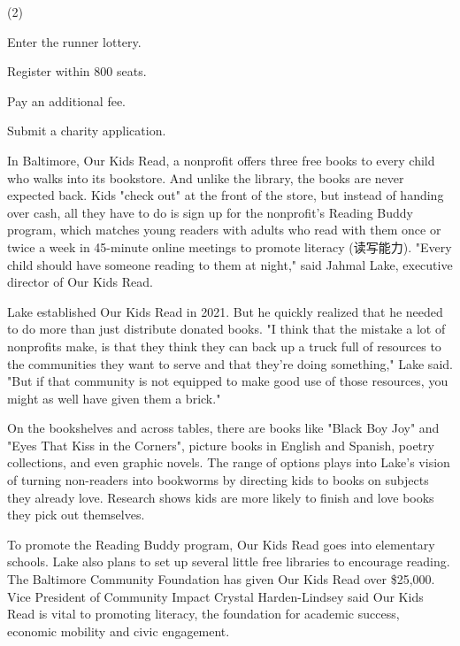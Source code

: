 \documentclass{英语试卷}
\begin{document}
\begin{choices}(2)
  \item Enter the runner lottery.
  \item Register within 800 seats.
  \item Pay an additional fee.
  \item Submit a charity application.
\end{choices}
\par In Baltimore, Our Kids Read, a nonprofit offers three free books to every child who walks into its bookstore. And unlike the library, the books are never expected back. Kids "check out" at the front of the store, but instead of handing over cash, all they have to do is sign up for the nonprofit’s Reading Buddy program, which matches young readers with adults who read with them once or twice a week in 45-minute online meetings to promote literacy (读写能力). "Every child should have someone reading to them at night," said Jahmal Lake, executive director of Our Kids Read.\par
\par Lake established Our Kids Read in 2021. But he quickly realized that he needed to do more than just distribute donated books. "I think that the mistake a lot of nonprofits make, is that they think they can back up a truck full of resources to the communities they want to serve and that they're doing something," Lake said. "But if that community is not equipped to make good use of those resources, you might as well have given them a brick."\par
\par On the bookshelves and across tables, there are books like "Black Boy Joy" and "Eyes That Kiss in the Corners", picture books in English and Spanish, poetry collections, and even graphic novels. The range of options plays into Lake's vision of turning non-readers into bookworms by directing kids to books on subjects they already love. Research shows kids are more likely to finish and love books they pick out themselves.\par
\par To promote the Reading Buddy program, Our Kids Read goes into elementary schools. Lake also plans to set up several little free libraries to encourage reading. The Baltimore Community Foundation has given Our Kids Read over \$25,000. Vice President of Community Impact Crystal Harden-Lindsey said Our Kids Read is vital to promoting literacy, the foundation for academic success, economic mobility and civic engagement.\par
\end{document}
